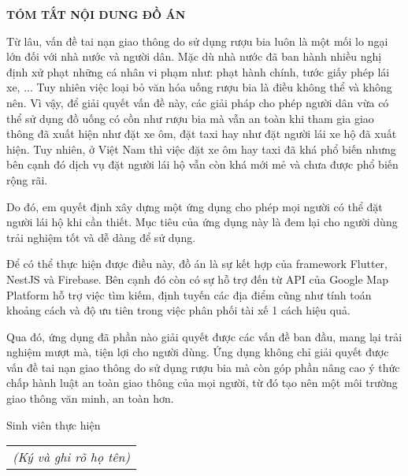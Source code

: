 \documentclass[../DoAn.tex]{subfiles}
\begin{document}
\begin{center}
    \Large{\textbf{TÓM TẮT NỘI DUNG ĐỒ ÁN}}\\
\end{center}
\vspace{1cm}
Từ lâu, vấn đề tai nạn giao thông do sử dụng rượu bia luôn là một mối lo ngại lớn đối với nhà nước và người dân.
Mặc dù nhà nước đã ban hành nhiều nghị định xử phạt những cá nhân vi phạm như: phạt hành chính, tước giấy phép lái xe, ... Tuy nhiên việc loại bỏ văn hóa uống rượu bia là điều không thể và không nên.
Vì vậy, để giải quyết vấn đề này, các giải pháp cho phép người dân vừa có thể sử dụng đồ uống có cồn như rượu bia mà vẫn an toàn khi tham gia giao thông đã xuất hiện như đặt xe ôm, đặt taxi hay như đặt người lái xe hộ đã xuất hiện.
Tuy nhiên, ở Việt Nam thì việc đặt xe ôm hay taxi đã khá phổ biến nhưng bên cạnh đó dịch vụ đặt người lái hộ vẫn còn khá mới mẻ và chưa được phổ biến rộng rãi.

Do đó, em quyết định xây dựng một ứng dụng cho phép mọi người có thể đặt người lái hộ khi cần thiết.
Mục tiêu của ứng dụng này là đem lại cho người dùng trải nghiệm tốt và dễ dàng để sử dụng.

Để có thể thực hiện được điều này, đồ án là sự kết hợp của framework Flutter, NestJS và Firebase.
Bên cạnh đó còn có sự hỗ trợ đến từ API của Google Map Platform hỗ trợ 
việc tìm kiếm, định tuyến các địa điểm cũng như tính toán khoảng cách và độ ưu tiên trong việc phân phối tài xế 1 cách hiệu quả.

Qua đó, ứng dụng đã phần nào giải quyết được các vấn đề ban đầu, mang lại trải nghiệm mượt mà, tiện lợi cho người dùng.
Ứng dụng không chỉ giải quyết được vấn đề tai nạn giao thông do sử dụng rượu bia mà còn góp phần nâng cao ý thức chấp hành luật an toàn giao thông của mọi người, từ đó tạo nên một môi trường giao thông văn minh, an toàn hơn.
\begin{flushright}
Sinh viên thực hiện\\
\begin{tabular}{@{}c@{}}
\textit{(Ký và ghi rõ họ tên)}
\end{tabular}
\end{flushright}
\end{document}
